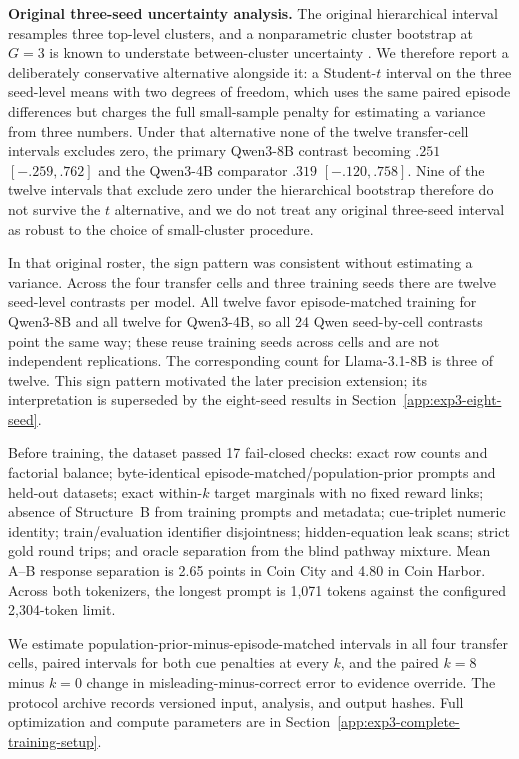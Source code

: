 \noindent\textbf{Original three-seed uncertainty analysis.}
\label{app:exp3-coin-cluster-sensitivity}
The original hierarchical interval resamples three top-level clusters, and a nonparametric
cluster bootstrap at $G=3$ is known to understate between-cluster uncertainty
\citep{cameron2008bootstrap}. We therefore report a deliberately conservative
alternative alongside it: a Student-$t$ interval on the three seed-level means with
two degrees of freedom, which uses the same paired episode differences but charges
the full small-sample penalty for estimating a variance from three numbers. Under
that alternative none of the twelve transfer-cell intervals excludes
zero, the primary Qwen3-8B contrast becoming $.251$ $[-.259,.762]$ and the Qwen3-4B
comparator $.319$ $[-.120,.758]$. Nine of the twelve intervals that exclude zero
under the hierarchical bootstrap therefore do not survive the $t$ alternative, and we
do not treat any original three-seed interval as robust to the choice of
small-cluster procedure.

In that original roster, the sign pattern was consistent without estimating a
variance. Across
the four transfer cells and three training seeds there are twelve seed-level
contrasts per model. All twelve favor episode-matched training for Qwen3-8B and all
twelve for Qwen3-4B, so all 24 Qwen seed-by-cell contrasts point the same way;
these reuse training seeds across cells and are not independent replications. The corresponding count for
Llama-3.1-8B is three of twelve. This sign pattern motivated the later precision
extension; its interpretation is superseded by the eight-seed results in
Section~\ref{app:exp3-eight-seed}.

Before training, the dataset passed 17 fail-closed checks: exact row counts and factorial
balance; byte-identical episode-matched/population-prior prompts and held-out datasets; exact
within-$k$ target marginals with no fixed reward links; absence of Structure~B
from training prompts and metadata; cue-triplet numeric identity; train/evaluation
identifier disjointness; hidden-equation leak scans; strict gold round trips; and
oracle separation from the blind pathway mixture. Mean A--B response separation
is 2.65 points in Coin City and 4.80 in Coin Harbor. Across both tokenizers,
the longest prompt is 1,071 tokens against the configured 2,304-token limit.

We estimate population-prior-minus-episode-matched intervals in all four transfer
cells, paired intervals for both cue penalties at every $k$, and the paired
$k=8$ minus $k=0$ change in misleading-minus-correct error to evidence override.
The protocol archive records versioned input, analysis, and output hashes. Full
optimization and compute parameters are in
Section~\ref{app:exp3-complete-training-setup}.

